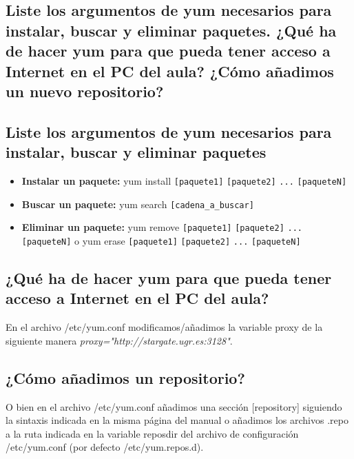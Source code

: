 \newpage
\begin{flushleft}
\section{Liste los argumentos de yum necesarios para instalar, buscar y eliminar paquetes. ¿Qué ha de hacer yum para que pueda tener acceso a Internet en el PC del aula? ¿Cómo añadimos un nuevo repositorio?}

\subsection{Liste los argumentos de yum necesarios para instalar, buscar y eliminar paquetes}
\begin{itemize}
	\item \textbf{Instalar un paquete: } yum install \verb|[paquete1]| \verb|[paquete2]| \verb|...| \verb|[paqueteN]|
	\item \textbf{Buscar un paquete: } yum search \verb|[cadena_a_buscar]|
	\item \textbf{Eliminar un paquete: } yum remove \verb|[paquete1]| \verb|[paquete2]| \verb|...| \verb|[paqueteN]| o yum erase \verb|[paquete1]| \verb|[paquete2]| \verb|...| \verb|[paqueteN]|\cite{c1a}
\end{itemize}

\subsection{¿Qué ha de hacer yum para que pueda tener acceso a Internet en el PC del aula?}
En el archivo /etc/yum.conf modificamos/añadimos la variable proxy de la siguiente manera \textit{proxy="http://stargate.ugr.es:3128"}. \cite{c1b}

\subsection{¿Cómo añadimos un repositorio?}
O bien en el archivo /etc/yum.conf añadimos una sección [repository] siguiendo la sintaxis indicada en la misma página del manual \cite{c1b} o añadimos los archivos .repo a la ruta indicada en la variable reposdir del archivo de configuración /etc/yum.conf (por defecto /etc/yum.repos.d).


\end{flushleft}

